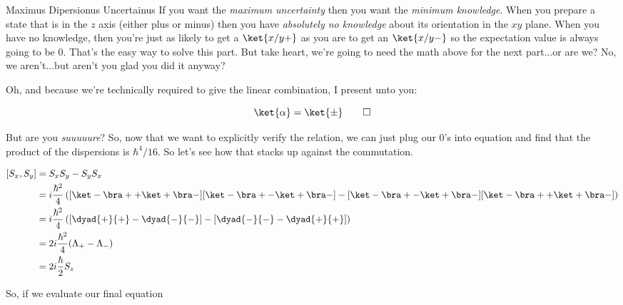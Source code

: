 \begin{answer}
\begin{answerpart}{Maximus Dipersionus Uncertainus}
    If you want the \emph{maximum uncertainty} then you want the
    \emph{minimum knowledge}.  When you prepare a state that is in the
    $z$ axis (either plus or minus) then you have \emph{absolutely no
    knowledge} about its orientation in the $xy$ plane.  When you have
    no knowledge, then you're just as likely to get a $\ket{x/y+}$ as
    you are to get an $\ket{x/y-}$ so the expectation value is always
    going to be 0.  That's the easy way to solve this part.  But take
    heart, we're going to need the math above for the next part...or
    are we?  No, we aren't...but aren't you glad you did it anyway?

    Oh, and because we're technically required to give the linear
    combination, I present unto you:

    \begin{equation}
      \ket{\alpha} = \ket{\pm}\qed
    \end{equation}
    
  \end{answerpart}
  
  \begin{answerpart}{But are you \emph{suuuuure}?}
    So, now that we want to explicitly verify the relation, we can
    just plug our 0's into equation  and find that the
    product of the dispersions is $\hbar^4/16$.  So let's see how that
    stacks up against the commutation.

    \begin{equation}
      \begin{split}
        [S_x, S_y]
        &=  S_xS_y - S_yS_x\\
        &= i\frac{\hbar^2}{4}
        \left(
             [\ket - \bra + + \ket + \bra - ]
             [\ket - \bra + - \ket + \bra - ]
             - 
             [\ket - \bra + - \ket + \bra - ]
             [\ket - \bra + + \ket + \bra - ]
             \right)
        \\
        &= i\frac{\hbar^2}{4}
        \left(
             [\dyad{+}{+} -\dyad{-}{-}]
             - 
             [\dyad{-}{-} - \dyad{+}{+}]
             \right)
        \\
        &= 2i\frac{\hbar^2}{4}(\Lambda_+ - \Lambda_-)\\
        &= 2i\frac{\hbar}{2}S_z\\
      \end{split}
    \end{equation}

    So, if we evaluate our final equation


\end{answerpart}
\end{answer}
